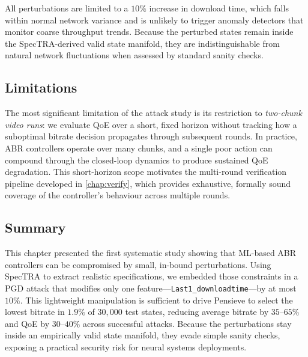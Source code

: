 \documentclass[thesis]{uofithesis} %
\begin{document}
    All perturbations are limited to a $10\%$ increase in download time,
    which falls within normal network variance and is unlikely to trigger
    anomaly detectors that monitor coarse throughput trends.  Because the
    perturbed states remain inside the SpecTRA-derived valid state manifold,
    they are indistinguishable from natural network fluctuations when
    assessed by standard sanity checks.
    
    
    \subsection{Limitations}
    \label{sec:attack-limitations}
    
    The most significant limitation of the attack study is its
    restriction to \emph{two-chunk video runs}: we evaluate QoE over
    a short, fixed horizon without tracking how a suboptimal bitrate
    decision propagates through subsequent rounds.  In practice, ABR
    controllers operate over many chunks, and a single poor action
    can compound through the closed-loop dynamics to produce sustained
    QoE degradation.  This short-horizon scope motivates the
    multi-round verification pipeline developed in \ref{chap:verify},
    which provides exhaustive, formally sound coverage of the
    controller's behaviour across multiple rounds.
    
    
    \subsection{Summary}
    \label{sec:attack-summary}
    
    This chapter presented the first systematic study showing that ML-based
    ABR controllers can be compromised by small, in-bound perturbations.
    Using SpecTRA to extract realistic specifications, we embedded those
    constraints in a PGD attack that modifies only one
    feature---\texttt{Last1\_downloadtime}---by at most $10\%$.  This
    lightweight manipulation is sufficient to drive Pensieve to select the
    lowest bitrate in $1.9\%$ of $30{,}000$ test states, reducing average
    bitrate by $35$--$65\%$ and QoE by $30$--$40\%$ across successful
    attacks.  Because the perturbations stay inside an empirically valid
    state manifold, they evade simple sanity checks, exposing a practical
    security risk for neural systems deployments.
    
\end{document}
